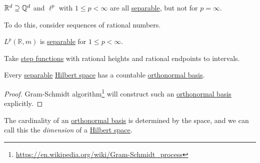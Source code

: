 \begin{eg}
	\(\mathbb{R}^d \supseteq \mathbb{\MakeUppercase{q}} ^d\) and \(\ell^p\) with \(1 \leq p < \infty\) are all \hyperref[def:separable]{separable},
	but not for \(p = \infty\).
\end{eg}
\begin{explanation}
	To do this, consider sequences of rational numbers.
\end{explanation}
\begin{eg}
	\(L^p(\mathbb{R},m)\) is \hyperref[def:separable]{separable} for \(1 \leq p < \infty\).
\end{eg}
\begin{explanation}
	Take \hyperref[def:step-function]{step functions} with rational heights and rational endpoints to intervals.
\end{explanation}
\begin{theorem}
	Every \hyperref[def:separable]{separable} \hyperref[def:Hilbert-space]{Hilbert space} has a countable \hyperref[def:orthonormal-basis]{orthonormal basis}.
\end{theorem}
\begin{proof}
	Gram-Schmidt algorithm\footnote{\url{https://en.wikipedia.org/wiki/Gram-Schmidt_process}} will construct such an \hyperref[def:orthonormal-basis]{orthonormal basis}
	explicitly.
\end{proof}

\begin{note}
	The cardinality of an \hyperref[def:orthonormal-basis]{orthonormal basis} is determined by the space, and we can call this the \emph{dimension} of a
	\hyperref[def:Hilbert-space]{Hilbert space}.
\end{note}

